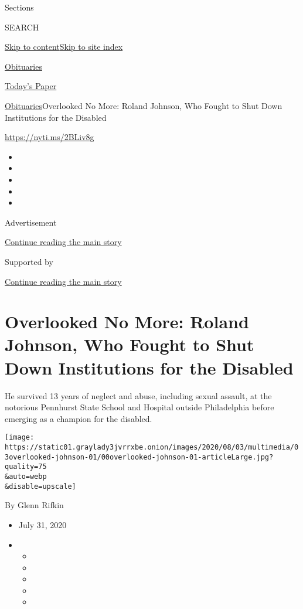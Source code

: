 Sections

SEARCH

\protect\hyperlink{site-content}{Skip to
content}\protect\hyperlink{site-index}{Skip to site index}

\href{https://www.nytimes3xbfgragh.onion/section/obituaries}{Obituaries}

\href{https://myaccount.nytimes3xbfgragh.onion/auth/login?response_type=cookie\&client_id=vi}{}

\href{https://www.nytimes3xbfgragh.onion/section/todayspaper}{Today's
Paper}

\href{/section/obituaries}{Obituaries}\textbar{}Overlooked No More:
Roland Johnson, Who Fought to Shut Down Institutions for the Disabled

\url{https://nyti.ms/2BLiv8g}

\begin{itemize}
\item
\item
\item
\item
\item
\end{itemize}

Advertisement

\protect\hyperlink{after-top}{Continue reading the main story}

Supported by

\protect\hyperlink{after-sponsor}{Continue reading the main story}

\hypertarget{overlooked-no-more-roland-johnson-who-fought-to-shut-down-institutions-for-the-disabled}{%
\section{Overlooked No More: Roland Johnson, Who Fought to Shut Down
Institutions for the
Disabled}\label{overlooked-no-more-roland-johnson-who-fought-to-shut-down-institutions-for-the-disabled}}

He survived 13 years of neglect and abuse, including sexual assault, at
the notorious Pennhurst State School and Hospital outside Philadelphia
before emerging as a champion for the disabled.

\texttt{[image: https://static01.graylady3jvrrxbe.onion/images/2020/08/03/multimedia/03overlooked-johnson-01/00overlooked-johnson-01-articleLarge.jpg?quality=75\\\&auto=webp\\\&disable=upscale]}

By Glenn Rifkin

\begin{itemize}
\item
  July 31, 2020
\item
  \begin{itemize}
  \item
  \item
  \item
  \item
  \item
  \end{itemize}
\end{itemize}

